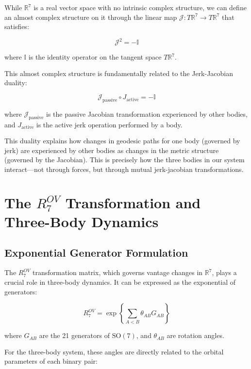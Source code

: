 \documentclass{article}
\begin{document}
While $\mathbb{R}^7$ is a real vector space with no intrinsic complex structure, we can define an almost complex structure on it through the linear map $\mathcal{J}: T\mathbb{R}^7 \rightarrow T\mathbb{R}^7$ that satisfies:

\begin{equation}
\mathcal{J}^2 = -\mathbb{I}
\end{equation}

where $\mathbb{I}$ is the identity operator on the tangent space $T\mathbb{R}^7$.

This almost complex structure is fundamentally related to the Jerk-Jacobian duality:

\begin{equation}
\mathcal{J}_{\text{passive}} \circ J_{\text{active}} = -\mathbb{I}
\end{equation}

where $\mathcal{J}_{\text{passive}}$ is the passive Jacobian transformation experienced by other bodies, and $J_{\text{active}}$ is the active jerk operation performed by a body.

This duality explains how changes in geodesic paths for one body (governed by jerk) are experienced by other bodies as changes in the metric structure (governed by the Jacobian). This is precisely how the three bodies in our system interact—not through forces, but through mutual jerk-jacobian transformations.

\section{The $R^{OV}_7$ Transformation and Three-Body Dynamics}

\subsection{Exponential Generator Formulation}

The $R^{OV}_7$ transformation matrix, which governs vantage changes in $\mathbb{R}^7$, plays a crucial role in three-body dynamics. It can be expressed as the exponential of generators:

\begin{equation}
R^{OV}_7 = \exp\left\{\sum_{A<B} \theta_{AB} G_{AB}\right\}
\end{equation}

where $G_{AB}$ are the 21 generators of $\text{SO}(7)$, and $\theta_{AB}$ are rotation angles.

For the three-body system, these angles are directly related to the orbital parameters of each binary pair:
\end{document}
